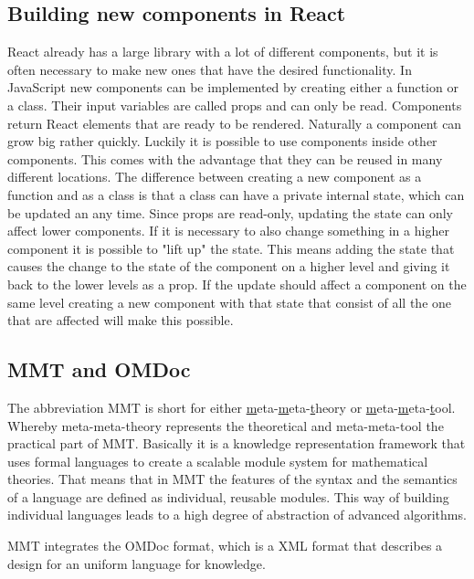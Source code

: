 \documentclass[11pt,a4paper]{article}
\begin{document}
\subsection{Building new components in React}
React already has a large library with a lot of different components, but it is often necessary to make new ones that have the desired functionality.
In JavaScript new components can be implemented by creating either a function or a class.
Their input variables are called props and can only be read.
Components return React elements that are ready to be rendered.
Naturally a component can grow big rather quickly.
Luckily it is possible to use components inside other components.
This comes with the advantage that they can be reused in many different locations.
The difference between creating a new component as a function and as a class is that a class can have a private internal state, which can be updated an any time.
Since props are read-only, updating the state can only affect lower components.
If it is necessary to also change something in a higher component it is possible to "lift up" the state.
This means adding the state that causes the change to the state of the component on a higher level and giving it back to the lower levels as a prop.
If the update should affect a component on the same level creating a new component with that state that consist of all the one that are affected will  make this possible.
\cite{reactjsGS}

\subsection{MMT and OMDoc}
The abbreviation MMT is short for either \underline{m}eta-\underline{m}eta-\underline{t}heory or \underline{m}eta-\underline{m}eta-\underline{t}ool.
Whereby meta-meta-theory represents the theoretical and meta-meta-tool the practical part of MMT.
Basically it is a knowledge representation framework that uses formal languages to create a scalable module system for mathematical theories.
That means that in MMT the features of the syntax and the semantics of a language are defined as individual, reusable modules.
This way of building individual languages leads to a high degree of abstraction of advanced algorithms.

MMT integrates the OMDoc format, which is a XML format that describes a design for an uniform language for knowledge.
\end{document}
